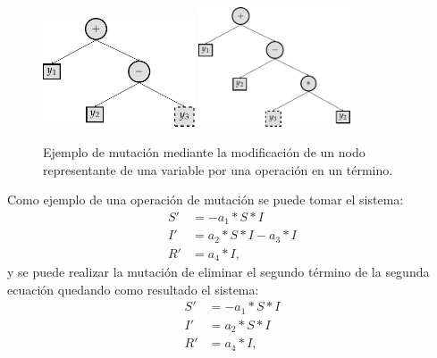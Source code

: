 \begin{itemize}
\begin{itemize}
\begin{center}
                        \begin{figure}[h]
                            \centering
                            \includegraphics[width=0.4\textwidth]{"figures/mutation_change_variable_by_node_1.pdf"}
                            \qquad
                            \includegraphics[width=0.4\textwidth]{"figures/mutation_change_variable_by_node_2.pdf"}
                            \caption{Ejemplo de mutación mediante la modificación de un nodo representante de una variable por una operación en un término.}
                            \label{tikzpicture:mutation_change_variable_by_node}
                        \end{figure}
                    \end{center}
          \end{itemize}
\end{itemize}

Como ejemplo de una operación de mutación se puede tomar el sistema:
\begin{align*}
    S' & = - a_1 * S * I         \\
    I' & = a_2 * S * I - a_3 * I \\
    R' & = a_4 * I,
\end{align*}
y se puede realizar la mutación de eliminar el segundo término de la segunda ecuación quedando como resultado el sistema:
\begin{align*}
    S' & = - a_1 * S * I \\
    I' & = a_2 * S * I   \\
    R' & = a_4 * I,
\end{align*}

